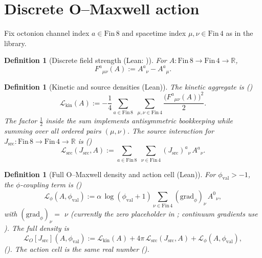 \documentclass[11pt]{amsart}
\newtheorem{definition}[theorem]{Definition}
\begin{document}
\section{Discrete O--Maxwell action}
\label{sec:discrete}

Fix octonion channel index \(a\in \mathrm{Fin}\,8\) and spacetime index \(\mu,\nu\in \mathrm{Fin}\,4\) as in the library.

\begin{definition}[Discrete field strength (Lean: )]
\label{def:F}
For \(A : \mathrm{Fin}\,8 \to \mathrm{Fin}\,4 \to \mathbb{R}\),
\[
F^a{}_{\mu\nu}(A) := A^a{}_\nu - A^a{}_\mu .
\]
\end{definition}

\begin{definition}[Kinetic and source densities (Lean)]
\label{def:kinetic-source}
The kinetic aggregate is ()
\begin{equation}
\label{eq:Lkin-expanded}
\mathcal{L}_{\mathrm{kin}}(A)
:= -\frac14 \sum_{a\in \mathrm{Fin}\,8}\;\sum_{\mu,\nu\in \mathrm{Fin}\,4}
\frac{\bigl(F^a{}_{\mu\nu}(A)\bigr)^2}{2}.
\end{equation}
The factor \(\tfrac12\) inside the sum implements antisymmetric bookkeeping while summing over all ordered pairs \((\mu,\nu)\). The source interaction for \(J_{\mathrm{src}} : \mathrm{Fin}\,8 \to \mathrm{Fin}\,4 \to \mathbb{R}\) is ()
\begin{equation}
\label{eq:Lsource-expanded}
\mathcal{L}_{\mathrm{src}}(J_{\mathrm{src}},A)
:= \sum_{a\in \mathrm{Fin}\,8}\;\sum_{\nu\in \mathrm{Fin}\,4} (J_{\mathrm{src}})^a{}_\nu\, A^a{}_\nu .
\end{equation}
\end{definition}

\begin{definition}[Full O--Maxwell density and action cell (Lean)]
\label{def:LOmaxwell}
For \(\phi_{\mathrm{val}}>-1\), the \(\phi\)-coupling term is ()
\[
\mathcal{L}_\phi(A,\phi_{\mathrm{val}})
:= \alpha\,\log(\phi_{\mathrm{val}}+1)\sum_{\nu\in \mathrm{Fin}\,4} (\mathrm{grad}_\phi)_\nu\, A^0{}_\nu ,
\]
with \((\mathrm{grad}_\phi)_\nu = \) \(\nu\) (currently the zero placeholder in ; continuum gradients use ). The full density is
\[
\mathcal{L}_O[J_{\mathrm{src}}](A,\phi_{\mathrm{val}})
:= \mathcal{L}_{\mathrm{kin}}(A) + 4\pi\,\mathcal{L}_{\mathrm{src}}(J_{\mathrm{src}},A) + \mathcal{L}_\phi(A,\phi_{\mathrm{val}}),
\]
(). The \emph{action cell} is the same real number ().
\end{definition}
\end{document}
